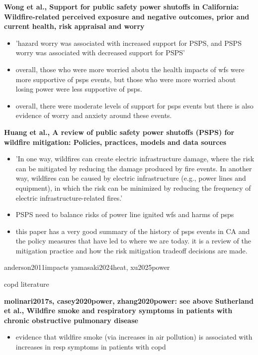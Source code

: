 \textbf{Wong et al., Support for public safety power shutoffs in California: Wildfire-related perceived exposure and negative outcomes, prior and current health, risk appraisal and worry}
\begin{itemize}
    \item 'hazard worry was associated with increased support for PSPS, and PSPS worry was associated with decreased support for PSPS'
    \item overall, those who were more worried abotu the health impacts of wfs were more supportive of psps events, but those who were more worried about losing power were less supportive of psps. 
    \item overall, there were moderate levels of support for psps events but there is also evidence of worry and anxiety around these events. 
\end{itemize}

\textbf{Huang et al., A review of public safety power shutoffs (PSPS) for wildfire mitigation: Policies, practices, models and data sources}
\begin{itemize}
    \item 'In one way, wildfires can create electric infrastructure damage, where the risk can be mitigated by reducing the damage produced by fire events. In another way, wildfires can be caused by electric infrastructure (e.g., power lines and equipment), in which the risk can be minimized by reducing the frequency of electric infrastructure-related fires.'
    \item PSPS need to balance risks of power line ignited wfs and harms of psps 
    \item this paper has a very good summary of the history of psps events in CA and the policy measures that have led to where we are today. it is a review of the mitigation practice and how the risk mitigation tradeoff decisions are made. 
\end{itemize}


anderson2011impacts
yamasaki2024heat, xu2025power




copd literature
\citep{molinari2017s, casey2020power, zhang2020power, sutherland2005wildfire, reid2019wildfire, wilgus2024clearing}

\textbf{molinari2017s, casey2020power, zhang2020power: see above}
\textbf{Sutherland et al., Wildfire smoke and respiratory symptoms in patients with chronic obstructive pulmonary disease}
\begin{itemize}
    \item evidence that wildfire smoke (via increases in air pollution) is associated with increases in resp symptoms in patients with copd
\end{itemize}

